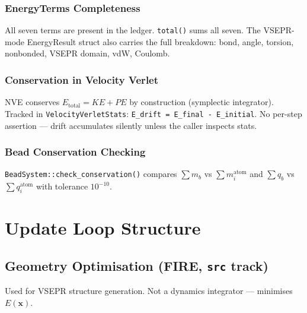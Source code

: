 \documentclass[11pt,a4paper]{article}
\begin{document}
\subsubsection{EnergyTerms Completeness}
All seven terms are present in the ledger. \texttt{total()} sums all seven.
The VSEPR-mode EnergyResult struct also carries the full breakdown: bond, angle, torsion, nonbonded, VSEPR domain, vdW, Coulomb.

\subsubsection{Conservation in Velocity Verlet}
NVE conserves $E_{\mathrm{total}} = KE + PE$ by construction (symplectic integrator).
Tracked in \texttt{VelocityVerletStats}: \texttt{E\_drift = E\_final - E\_initial}.
No per-step assertion --- drift accumulates silently unless the caller inspects stats.

\subsubsection{Bead Conservation Checking}
\texttt{BeadSystem::check\_conservation()} compares $\sum m_b$ vs $\sum m_i^{\mathrm{atom}}$
and $\sum q_b$ vs $\sum q_i^{\mathrm{atom}}$ with tolerance $10^{-10}$.

\section{Update Loop Structure}

\subsection{Geometry Optimisation (FIRE, \texttt{src} track)}

Used for VSEPR structure generation. Not a dynamics integrator --- minimises $E(\mathbf{x})$.
\end{document}
